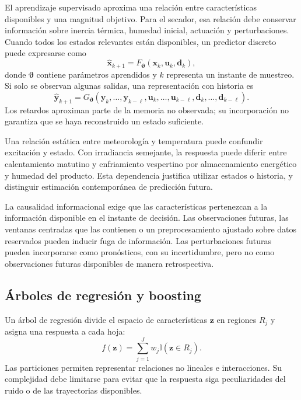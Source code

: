 El aprendizaje supervisado aproxima una relación entre características disponibles y una magnitud objetivo. Para el secador, esa relación debe conservar información sobre inercia térmica, humedad inicial, actuación y perturbaciones. Cuando todos los estados relevantes están disponibles, un predictor discreto puede expresarse como
\begin{equation}
\widehat{\mathbf x}_{k+1}
=F_{\boldsymbol\vartheta}(\mathbf x_k,\mathbf u_k,\mathbf d_k),
\label{eq:ml_general}
\end{equation}
donde $\boldsymbol\vartheta$ contiene parámetros aprendidos y $k$ representa un instante de muestreo. Si solo se observan algunas salidas, una representación con historia es
\begin{equation}
\widehat{\mathbf y}_{k+1}
=G_{\boldsymbol\vartheta}(\mathbf y_k,\ldots,\mathbf y_{k-\ell},
\mathbf u_k,\ldots,\mathbf u_{k-\ell},
\mathbf d_k,\ldots,\mathbf d_{k-\ell}).
\label{eq:predictor_con_memoria}
\end{equation}
Los retardos aproximan parte de la memoria no observada; su incorporación no garantiza que se haya reconstruido un estado suficiente.

Una relación estática entre meteorología y temperatura puede confundir excitación y estado. Con irradiancia semejante, la respuesta puede diferir entre calentamiento matutino y enfriamiento vespertino por almacenamiento energético y humedad del producto. Esta dependencia justifica utilizar estados o historia, y distinguir estimación contemporánea de predicción futura.

La causalidad informacional exige que las características pertenezcan a la información disponible en el instante de decisión. Las observaciones futuras, las ventanas centradas que las contienen o un preprocesamiento ajustado sobre datos reservados pueden inducir fuga de información. Las perturbaciones futuras pueden incorporarse como pronósticos, con su incertidumbre, pero no como observaciones futuras disponibles de manera retrospectiva.

\subsection{Árboles de regresión y boosting}
\label{subsec:arboles_boosting}

Un árbol de regresión divide el espacio de características $\mathbf z$ en regiones $R_j$ y asigna una respuesta a cada hoja:
\begin{equation}
f(\mathbf z)=\sum_{j=1}^{J}w_j\mathbb I(\mathbf z\in R_j).
\label{eq:prediccion_arbol}
\end{equation}
Las particiones permiten representar relaciones no lineales e interacciones. Su complejidad debe limitarse para evitar que la respuesta siga peculiaridades del ruido o de las trayectorias disponibles.

